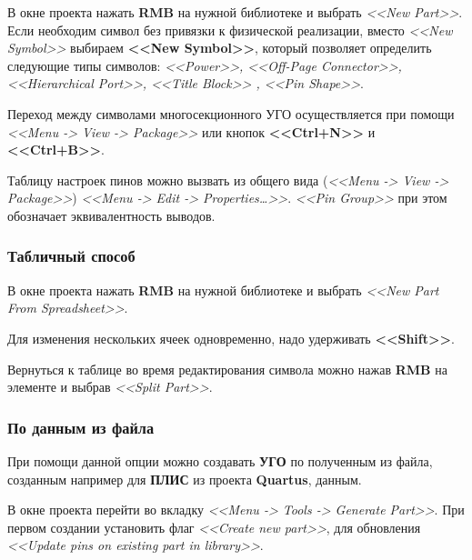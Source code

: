 В окне проекта нажать \textbf{RMB} на нужной библиотеке и выбрать \textit{<<New Part>>}. Если необходим символ без привязки к физической реализации, вместо \textit{<<New Symbol>>} выбираем \textbf{<<New Symbol>>}, который позволяет определить следующие типы символов: \textit{<<Power>>, <<Off-Page Connector>>, <<Hierarchical Port>>, <<Title Block>> , <<Pin Shape>>}.

Переход между символами многосекционного УГО осуществляется при помощи \textit{<<Menu -> View -> Package>>} или кнопок \textbf{<<Ctrl+N>>} и \textbf{<<Ctrl+B>>}.

Таблицу настроек пинов можно вызвать из общего вида (\textit{<<Menu -> View -> Package>>}) \textit{<<Menu -> Edit -> Properties\ldots>>}. \textit{<<Pin Group>>} при этом обозначает эквивалентность выводов.
	\begin{figure}[H]
	\end{figure}

\subsubsection{Табличный способ} \label{sssec:create_symbol_table}

В окне проекта нажать \textbf{RMB} на нужной библиотеке и выбрать \textit{<<New Part From Spreadsheet>>}.

Для изменения нескольких ячеек одновременно, надо удерживать \textbf{<<Shift>>}. 

Вернуться к таблице во время редактирования символа можно нажав \textbf{RMB} на элементе и выбрав \textit{<<Split Part>>}.
	\begin{figure}[H]
	\end{figure}



\subsubsection{По данным из файла} \label{sssec:create_symbol_file}

При помощи данной опции можно создавать \textbf{УГО} по полученным из файла, созданным например для \textbf{ПЛИС} из проекта \textbf{Quartus}, данным.

В окне проекта перейти во вкладку \textit{<<Menu -> Tools -> Generate Part>>}. При первом создании установить флаг \textit{<<Create new part>>}, для обновления \textit{<<Update pins on existing part in library>>}.

